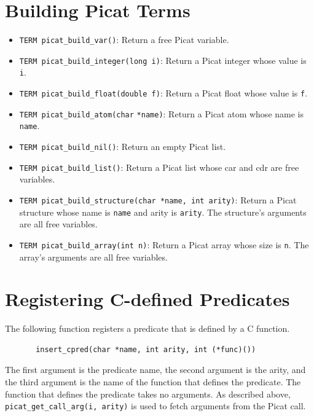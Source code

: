 \section{Building Picat Terms}
\begin{itemize}
\item \texttt{TERM picat\_build\_var()}: Return a free Picat variable.

\item \texttt{TERM picat\_build\_integer(long i)}: Return a Picat integer whose value is \texttt{i}.

\item \texttt{TERM picat\_build\_float(double f)}: Return a Picat float whose value is \texttt{f}.

\item \texttt{TERM picat\_build\_atom(char} \texttt{*name)}: Return a Picat atom whose name is \texttt{name}.

\item \texttt{TERM picat\_build\_nil()}: Return an empty Picat list.

\item \texttt{TERM picat\_build\_list()}: Return a Picat list whose car and cdr are free variables.

\item \texttt{TERM picat\_build\_structure(char *name, int arity)}: Return a Picat \newline structure whose name is \texttt{name} and arity is \texttt{arity}.  The structure's arguments are all free variables.

\item \texttt{TERM picat\_build\_array(int n)}: Return a Picat array whose size is \texttt{n}.  The array's arguments are all free variables.
\end{itemize}

\section{Registering C-defined Predicates}
The following function registers a predicate that is defined by a C function.
\begin{verbatim}
       insert_cpred(char *name, int arity, int (*func)())
\end{verbatim}
The first argument is the predicate name, the second argument is the arity, and the third argument is the name of the function that defines the predicate. The function that defines the predicate takes no arguments. As described above, \texttt{picat\_get\_call\_arg(i, arity)} is used to fetch arguments from the Picat call.

